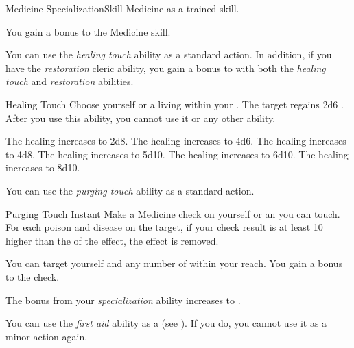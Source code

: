     \begin{feat}{Medicine Specialization}{Skill}
        \featpre Medicine as a trained skill.

         You gain a  bonus to the Medicine skill.

         You can use the \textit{healing touch} ability as a standard action.
        In addition, if you have the \textit{restoration} cleric ability, you gain a  bonus to  with both the \textit{healing touch} and \textit{restoration} abilities.
        \begin{instantability}{Healing Touch}
            \rankline
            Choose yourself or a living  within your .
            The target regains 2d6 \add {} .
            After you use this ability, you  cannot use it or any other  ability.

            \rankline
             The healing increases to 2d8.
             The healing increases to 4d6.
             The healing increases to 4d8.
             The healing increases to 5d10.
             The healing increases to 6d10.
             The healing increases to 8d10.
        \end{instantability}

         You can use the \textit{purging touch} ability as a standard action.
        \begin{instantability}{Purging Touch}
            Instant
            \rankline
            Make a Medicine check on yourself or an  you can touch.
            For each poison and disease on the target, if your check result is at least 10 higher than the  of the effect, the effect is removed.

            \rankline
             You can target yourself and any number of  within your reach.
             You gain a  bonus to the check.
        \end{instantability}

         The bonus from your \textit{specialization} ability increases to .

         You can use the \textit{first aid} ability as a  (see ).
        If you do, you  cannot use it as a minor action again.


\end{feat}
